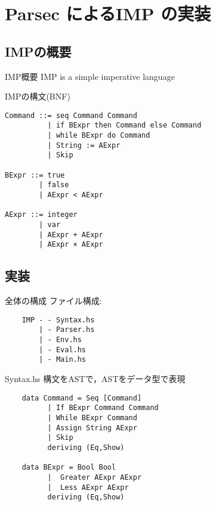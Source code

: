 \documentclass[uplatex,dvipdfmx,ja=standard]{beamer}
\begin{document}
\section{Parsec によるIMP の実装}

\subsection{IMPの概要}

\begin{frame}{IMP概要}
    \Large IMP is a simple imperative language 
\end{frame}

\begin{frame}[fragile]{IMPの構文(BNF)}
    \begin{verbatim}
Command ::= seq Command Command 
          | if BExpr then Command else Command
          | while BExpr do Command
          | String := AExpr
          | Skip

BExpr ::= true
        | false
        | AExpr < AExpr

AExpr ::= integer 
        | var
        | AExpr + AExpr
        | AExpr × AExpr
    \end{verbatim}
\end{frame}

\subsection{実装}

\begin{frame}[fragile]{全体の構成}
    ファイル構成:
    \begin{verbatim}
    IMP - - Syntax.hs
        | - Parser.hs 
        | - Env.hs
        | - Eval.hs
        | - Main.hs
    \end{verbatim}
\end{frame}

\begin{frame}[fragile]{Syntax.hs}
    構文をASTで，ASTをデータ型で表現
    \begin{verbatim}
    data Command = Seq [Command]
          | If BExpr Command Command
          | While BExpr Command 
          | Assign String AExpr
          | Skip
          deriving (Eq,Show)

    data BExpr = Bool Bool
          |  Greater AExpr AExpr
          |  Less AExpr AExpr
          deriving (Eq,Show)
    \end{verbatim}
\end{frame}
\end{document}
